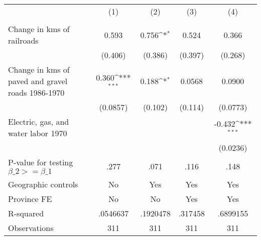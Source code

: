 {
\def\sym#1{\ifmmode^{#1}\else\(^{#1}\)\fi}
\begin{tabular}{l*{4}{c}}
\hline\hline
                &\multicolumn{1}{c}{(1)}&\multicolumn{1}{c}{(2)}&\multicolumn{1}{c}{(3)}&\multicolumn{1}{c}{(4)}\\
                &\multicolumn{1}{c}{}&\multicolumn{1}{c}{}&\multicolumn{1}{c}{}&\multicolumn{1}{c}{}\\
\hline
Change in kms of railroads&    0.593         &    0.756\sym{*}  &    0.524         &    0.366         \\
                &  (0.406)         &  (0.386)         &  (0.397)         &  (0.268)         \\
[1em]
Change in kms of paved and gravel roads 1986-1970&    0.360\sym{***}&    0.188\sym{*}  &   0.0568         &   0.0900         \\
                & (0.0857)         &  (0.102)         &  (0.114)         & (0.0773)         \\
[1em]
Electric, gas, and water labor 1970&                  &                  &                  &   -0.432\sym{***}\\
                &                  &                  &                  & (0.0236)         \\
\hline
P-value for testing $\beta\_{2} >= \beta\_{1}$&     .277         &     .071         &     .116         &     .148         \\
Geographic controls&       No         &      Yes         &      Yes         &      Yes         \\
Province FE     &       No         &       No         &      Yes         &      Yes         \\
R-squared       & .0546637         & .1920478         &  .317458         & .6899155         \\
Observations    &      311         &      311         &      311         &      311         \\
\hline\hline
\end{tabular}
}
